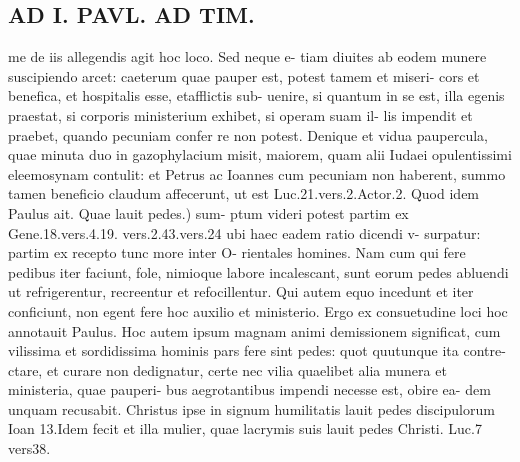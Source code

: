 \documentclass{article}
\begin{document}
\begin{pages}
\section*{AD I. PAVL. AD TIM. }
\marginpar{[ p.A0O ]}me de iis allegendis agit hoc loco. Sed neque e- tiam diuites ab eodem munere suscipiendo arcet: caeterum quae pauper est, potest tamem et miseri- cors et benefica, et hospitalis esse, etafflictis sub- uenire, si quantum in se est, illa egenis praestat, si corporis ministerium exhibet, si operam suam il- lis impendit et praebet, quando pecuniam confer re non potest. Denique et vidua paupercula, quae minuta duo in gazophylacium misit, maiorem, quam alii Iudaei opulentissimi eleemosynam contulit: et Petrus ac Ioannes cum pecuniam non haberent, summo tamen beneficio claudum affecerunt, ut est Luc.21.vers.2.Actor.2. Quod idem Paulus ait. Quae lauit pedes.) sum- ptum videri potest partim ex Gene.18.vers.4.19. vers.2.43.vers.24 ubi haec eadem ratio dicendi v- surpatur: partim ex recepto tunc more inter O- rientales homines. Nam cum qui fere pedibus iter faciunt, fole, nimioque labore incalescant, sunt eorum pedes abluendi ut refrigerentur, recreentur et refocillentur. Qui autem equo incedunt et iter conficiunt, non egent fere hoc auxilio et ministerio. Ergo ex consuetudine loci hoc annotauit Paulus. Hoc autem ipsum magnam animi demissionem significat, cum vilissima et sordidissima hominis pars fere sint pedes: quot quutunque ita contre- ctare, et curare non dedignatur, certe nec vilia quaelibet alia munera et ministeria, quae pauperi- bus aegrotantibus impendi necesse est, obire ea- dem unquam recusabit. Christus ipse in signum humilitatis lauit pedes discipulorum Ioan 13.Idem fecit et illa mulier, quae lacrymis suis lauit pedes Christi. Luc.7 vers38. 

\end{pages}
\end{document}

